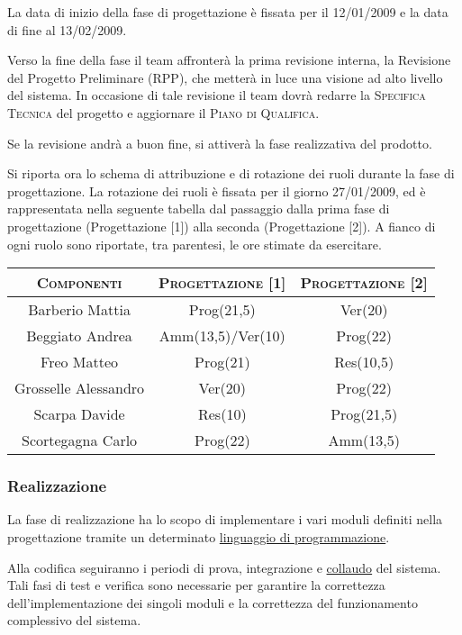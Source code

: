 \documentclass[11pt,a4paper]{article}
\begin{document}
La data di inizio della fase di progettazione è fissata per il 12/01/2009 e la data di fine al 13/02/2009.

Verso la fine della fase il team affronterà la prima revisione interna, la Revisione del Progetto Preliminare (RPP), che metterà in luce una visione ad alto livello del sistema.
In occasione di tale revisione il team dovrà redarre la \textsc{Specifica Tecnica} del progetto e aggiornare il \textsc{Piano di Qualifica}.

Se la revisione andrà a buon fine, si attiverà la fase realizzativa del prodotto.



Si riporta ora lo schema di attribuzione e di rotazione dei ruoli durante la fase di progettazione.
La rotazione dei ruoli è fissata per il giorno 27/01/2009, ed è rappresentata nella seguente tabella dal passaggio dalla prima fase di progettazione (Progettazione [1]) alla seconda (Progettazione [2]).
A fianco di ogni ruolo sono riportate, tra parentesi, le ore stimate da esercitare.
\\
\begin{center}
\begin{tabular}{|c||c|c|}
\hline
\textsc{Componenti} & \textsc{Progettazione [1]} & \textsc{Progettazione [2]} \\ \hline \hline
Barberio Mattia & Prog(21,5) & Ver(20) \\ \hline
Beggiato Andrea & Amm(13,5)/Ver(10) & Prog(22) \\ \hline
Freo Matteo & Prog(21) & Res(10,5) \\ \hline
Grosselle Alessandro & Ver(20) & Prog(22) \\ \hline
Scarpa Davide & Res(10) & Prog(21,5) \\ \hline
Scortegagna Carlo & Prog(22) & Amm(13,5) \\ \hline
\end{tabular}
\end{center}
\bigskip
\subsubsection{Realizzazione}
La fase di realizzazione ha lo scopo di implementare i vari moduli definiti nella progettazione tramite un determinato \underline{linguaggio di programmazione}.

Alla codifica seguiranno i periodi di prova, integrazione e \underline{collaudo} del sistema.
Tali fasi di test e verifica sono necessarie per garantire la correttezza dell'implementazione dei singoli moduli e la correttezza del funzionamento complessivo del sistema.
\end{document}
